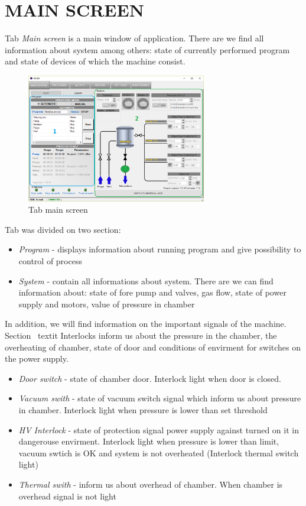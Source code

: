 \section {MAIN SCREEN}

Tab \textit{Main screen} is a main window of application. There are we find all information about system among others: state of currently performed program and state of devices of which the machine consist.

	\begin{figure}[!h] 
	\centering \includegraphics[width=0.7\textwidth]{Graphic/MainScreen/MainScreen.png}	
	\caption{Tab main screen}
	\label{tab_main_screen}
	\end{figure}
	\FloatBarrier

Tab was divided  on two section:

\begin{itemize}
	\item \textit{ Program} - displays information about running program and give possibility to control of process
	\item \textit{ System} - contain all informations about system. There are we can find information about: state of fore pump and  valves,  gas flow, state of power supply  and motors, value of pressure  in chamber 
\end{itemize}

In addition, we will find information on the important signals of the machine. Section \ textit {Interlocks} inform us about the pressure in the chamber, the overheating of  chamber, state of door and conditions of envirment for switches on the power supply.

\begin{itemize}
	\item \textit{Door switch} - state of chamber door. Interlock light when door is closed. 
	\item \textit{Vacuum swith} - state of vacuum switch signal which inform us about pressure in chamber. Interlock light  when pressure is lower than set threshold
	\item \textit{HV Interlock} - state of protection signal power supply against turned on it in dangerouse envirment. Interlock light when pressure is lower than limit, vacuum swtich is OK and system is not overheated (Interlock thermal switch light)
	\item \textit{Thermal swith} - inform us about overhead of chamber. When chamber is overhead signal is not light
\end{itemize}

